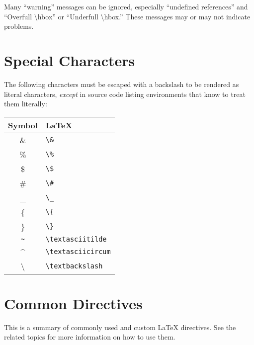 Many ``warning'' messages can be ignored, especially ``undefined references'' and ``Overfull {\textbackslash}hbox'' or ``Underfull {\textbackslash}hbox.'' These messages may or may not indicate problems.

\section{Special Characters}

The following characters must be escaped with a backslash to be rendered as literal characters, \emph{except} in source code listing environments that know to treat them literally:

\begin{center}
\begin{tabular}{|c|l|}
\hline
\textbf{Symbol} & \textbf{LaTeX} \\
\hline
\& & \verb|\&| \\
\% & \verb|\%| \\
\$ & \verb|\$| \\
\# & \verb|\#| \\
\_ & \verb|\_| \\
\{ & \verb|\{| \\
\} & \verb|\}| \\
\texttt{\textasciitilde} & \verb|\textasciitilde| \\
\textasciicircum & \verb|\textasciicircum| \\
\textbackslash & \verb|\textbackslash| \\
\hline
\end{tabular}
\end{center}


\section{Common Directives}

This is a summary of commonly used and custom LaTeX directives. See the related topics for more information on how to use them.

